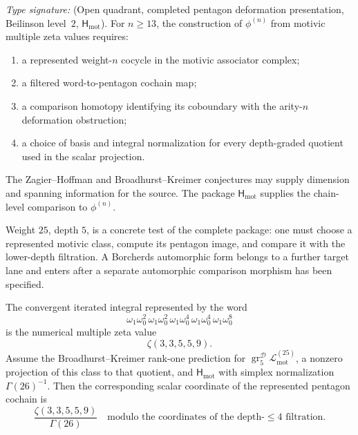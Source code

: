 \begin{proposition}
\label{prop:nc-double-conditional-phi-n}
\ClaimStatusOpen
\emph{Type signature:}
\textup{(Open quadrant, completed pentagon deformation presentation,
Beilinson level~\(2\), \(\mathsf H_{\mathrm{mot}}\)).}
For \(n\ge13\), the construction of \(\phi^{(n)}\) from motivic
multiple zeta values requires:
\begin{enumerate}[label=\textup{(M\arabic*)}]
\item a represented weight-\(n\) cocycle in the motivic associator
 complex;
\item a filtered word-to-pentagon cochain map;
\item a comparison homotopy identifying its coboundary with the
 arity-\(n\) deformation obstruction;
\item a choice of basis and integral normalization for every
 depth-graded quotient used in the scalar projection.
\end{enumerate}
The Zagier--Hoffman and Broadhurst--Kreimer conjectures may supply
dimension and spanning information for the source.  The package
\(\mathsf H_{\mathrm{mot}}\) supplies the chain-level comparison to
\(\phi^{(n)}\).
\end{proposition}

\begin{remark}
\label{rem:nc-phi-25-tightening}
Weight \(25\), depth \(5\), is a concrete test of the complete
package: one must choose a represented motivic class, compute its
pentagon image, and compare it with the lower-depth filtration.  A
Borcherds automorphic form belongs to a further target lane and enters
after a separate automorphic comparison morphism has been specified.
\end{remark}

\begin{proposition}
\label{prop:nc-phi-25-depth-5-coefficient}
\ClaimStatusConditional
The convergent iterated integral represented by the word
\[
 \omega_1\omega_0^2\,
 \omega_1\omega_0^2\,
 \omega_1\omega_0^4\,
 \omega_1\omega_0^4\,
 \omega_1\omega_0^8
\]
is the numerical multiple zeta value
\[
 \zeta(3,3,5,5,9).
\]
Assume the Broadhurst--Kreimer rank-one prediction for
\(\operatorname{gr}^{\mathcal D}_5\mathcal L_{\mathrm{mot}}^{(25)}\),
a nonzero projection of this class to that quotient, and
\(\mathsf H_{\mathrm{mot}}\) with simplex normalization
\(\Gamma(26)^{-1}\).
Then the corresponding scalar coordinate of the represented pentagon
cochain is
\[
 \frac{\zeta(3,3,5,5,9)}{\Gamma(26)}
 \quad\text{modulo the coordinates of the depth-\(\le4\) filtration.}
\]
\end{proposition}

